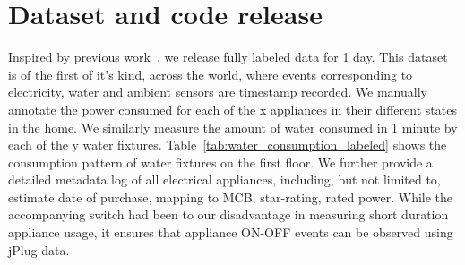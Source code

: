 \documentclass[10pt]{sensys-proc}
\newcommand{\tabref}[1]{Table~\ref{#1}}
\begin{document}
\section{Dataset and code release}
Inspired by previous work~\cite{blued_cmu}, we release fully labeled data for 1 day. This dataset is of the first of it's kind, across the world, where events corresponding to electricity, water and ambient sensors are timestamp recorded. We manually annotate the power consumed for each of the x appliances in their different states in the home. We similarly measure the amount of water consumed in 1 minute by each of the y water fixtures. \tabref{tab:water_consumption_labeled} shows the consumption pattern of water fixtures on the first floor. We further provide a detailed metadata log of all electrical appliances, including, but not limited to, estimate date of purchase, mapping to MCB, star-rating, rated power. 
While the accompanying switch had been to our disadvantage in measuring short duration appliance usage, it ensures that appliance ON-OFF events can be observed using jPlug data. 
\end{document}
